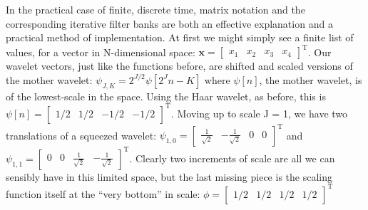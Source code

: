 \documentclass[letterpaper]{article}
\begin{document}
In the practical case of finite, discrete time, matrix notation and the corresponding iterative filter banks
are both an effective explanation and a practical method of implementation.
At first we might simply see a finite list of values, for a vector in N-dimensional space: 
\(
\mathbf{x} = 
\begin{bmatrix}
x_1 & x_2 & x_3 & x_4
\end{bmatrix}^\mathrm{T}
\).
Our wavelet vectors, just like the functions before, are shifted and scaled versions of the mother wavelet:
\(
\psi_{J,K} = 2^{J/2}\psi[2^J n-K]
\) where \(\psi[n]\), the mother wavelet, is of the lowest-scale in the space.
Using the Haar wavelet, as before, this is
\( \psi[n] = \begin{bmatrix} 1/2 & 1/2 & -1/2 & -1/2 \end{bmatrix}^\mathrm{T} \).
Moving up to scale J = 1, we have two translations of a squeezed wavelet:
\( \psi_{1,0} = \begin{bmatrix} \tfrac{1}{\sqrt{2}} & -\tfrac{1}{\sqrt{2}} & 0 & 0 \end{bmatrix}^\mathrm{T} \)
and
\( \psi_{1,1} = \begin{bmatrix} 0 & 0 & \tfrac{1}{\sqrt{2}} & -\tfrac{1}{\sqrt{2}} \end{bmatrix}^\mathrm{T} \).
Clearly two increments of scale are all we can sensibly have in this limited space,
but the last missing piece is the scaling function itself at the ``very bottom'' in scale:
\( \phi = \begin{bmatrix} 1/2 & 1/2 & 1/2 & 1/2 \end{bmatrix}^\mathrm{T} \)
\end{document}
